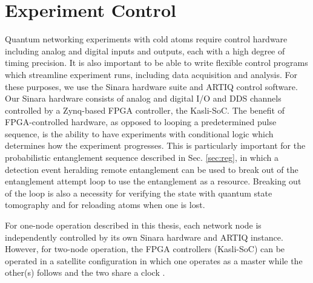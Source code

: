 

\section{Experiment Control}

Quantum networking experiments with cold atoms require control hardware including analog and digital inputs and outputs, each with a high degree of timing precision. It is also important to be able to write flexible control programs which streamline experiment runs, including data acquisition and analysis. For these purposes, we use the Sinara hardware suite and ARTIQ control software. Our Sinara hardware consists of analog and digital I/O and DDS channels controlled by a Zynq-based FPGA controller, the Kasli-SoC\cite{lam2021combining}. The benefit of FPGA-controlled hardware, as opposed to looping a predetermined pulse sequence, is the ability to have experiments with conditional logic which determines how the experiment progresses. This is particularly important for the probabilistic entanglement sequence described in Sec. \ref{sec:reg}, in which a detection event heralding remote entanglement can be used to break out of the entanglement attempt loop to use the entanglement as a resource. Breaking out of the loop is also a necessity for verifying the state with quantum state tomography and for reloading atoms when one is lost.

For one-node operation described in this thesis, each network node is independently controlled by its own Sinara hardware and ARTIQ instance. However, for two-node operation, the FPGA controllers (Kasli-SoC) can be operated in a satellite configuration in which one operates as a master while the other(s) follows and the two share a clock \cite{Stephenson2020}. 

